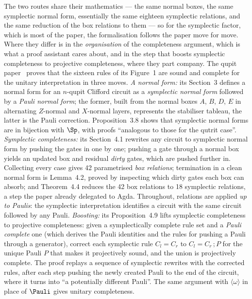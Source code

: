 The two routes share their mathematics --- the same normal boxes, the
same symplectic normal form, essentially the same eighteen symplectic
relations, and the same reduction of the box relations to them --- so
for the symplectic factor, which is most of the paper, the
formalisation follows the paper move for move.  Where they differ is
in the \emph{organisation} of the completeness argument, which is what
a proof assistant cares about, and in the step that boosts symplectic
completeness to projective completeness, where they part company.
The qupit paper~\cite{bian2026qudit} proves that the sixteen rules of
its Figure~1 are sound and complete for the unitary interpretation in
three moves.  \emph{A normal form:} its Section~3 defines a normal form
for an $n$-qupit Clifford circuit as a \emph{symplectic normal form}
followed by a \emph{Pauli normal form}; the former, built from the
normal boxes $A$, $B$, $D$, $E$ in alternating $Z$-normal and $X$-normal
layers, represents the stabiliser tableau, the latter is the Pauli
correction.  Proposition~3.8 shows that symplectic normal forms are in
bijection with $\Sp$, with proofs ``analogous to those for the qutrit
case''.  \emph{Symplectic completeness:} its Section~4.1 rewrites any
circuit to symplectic normal form by pushing the gates in one by one;
pushing a gate through a normal box yields an updated box and residual
\emph{dirty} gates, which are pushed further in.  Collecting every case
gives 42 parametrised \emph{box relations}; termination in a clean
normal form is Lemma~4.2, proved by inspecting which dirty gates each
box can absorb; and Theorem~4.4 reduces the 42 box relations to 18
symplectic relations, a step the paper already delegated to Agda.
Throughout, relations are applied \emph{up to Paulis}: the symplectic
interpretation identifies a circuit with the same circuit followed by
any Pauli.  \emph{Boosting:} its Proposition~4.9 lifts symplectic
completeness to projective completeness: given a symplectically
complete rule set and a \emph{Pauli complete} one (which derives the
Pauli identities and the rules for pushing a Pauli through a
generator), correct each symplectic rule $C_l = C_r$ to $C_l = C_r\,;P$
for the unique Pauli $P$ that makes it projectively sound, and the union
is projectively complete.  The proof replays a sequence of symplectic
rewrites with the corrected rules, after each step pushing the newly
created Pauli to the end of the circuit, where it turns into ``a
potentially different Pauli''.  The same argument with
$\langle\omega\rangle$ in place of $\Pauli$ gives unitary completeness.

